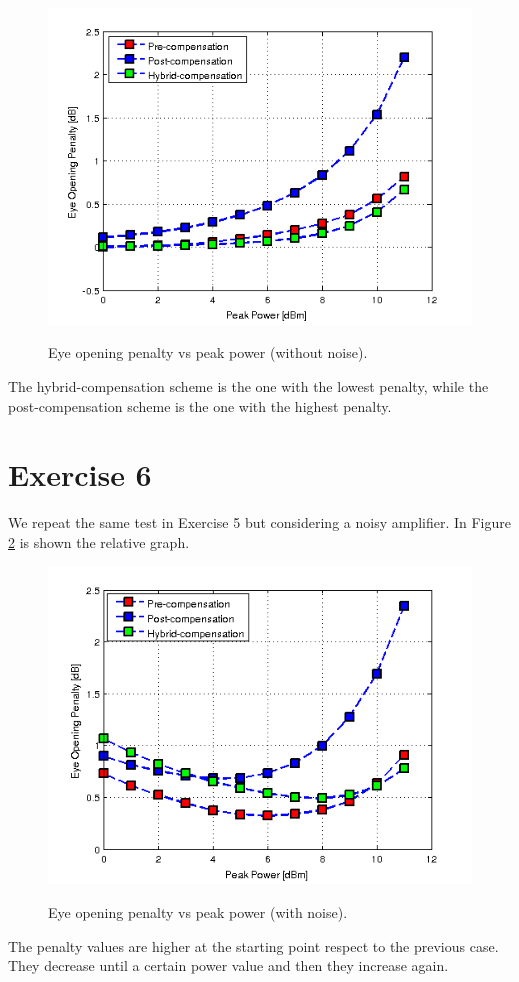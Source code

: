 \documentclass[a4paper,10pt]{report}
\begin{document}
\begin{figure}[!ht]
  \centering
  \includegraphics[width=12cm]{es5_1.png}\\
  \caption{Eye opening penalty vs peak power (without noise).}
  \label{es5_1}
\end{figure}

The hybrid-compensation scheme is the one with the lowest penalty, while the post-compensation scheme is the one with the highest penalty.


\section*{Exercise 6}
We repeat the same test in Exercise 5 but considering a noisy amplifier. In Figure \ref{es5_2} is shown the relative graph.

\begin{figure}[!ht]
  \centering
  \includegraphics[width=12cm]{es5_2.png}\\
  \caption{Eye opening penalty vs peak power (with noise).}
  \label{es5_2}
\end{figure}

The penalty values are higher at the starting point respect to the previous case. They decrease until a certain power value and then they increase again.
\end{document}
